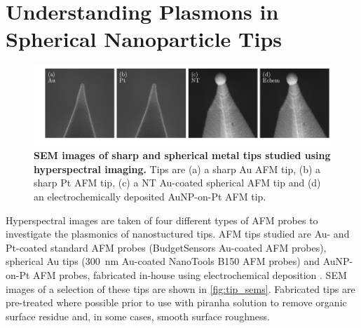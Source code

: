 \documentclass{article}
\begin{document}
\section{Understanding Plasmons in Spherical Nanoparticle Tips}

\begin{figure}[bt]
\centering
\includegraphics{figures/tip_sems}
\caption[SEM images of sharp and spherical metal tips studied using hyperspectral imaging]{\textbf{SEM images of sharp and spherical metal tips studied using hyperspectral imaging.} Tips are  (a) a sharp Au AFM tip, (b) a sharp Pt AFM tip, (c) a NT Au-coated spherical AFM tip and (d) an electrochemically deposited AuNP-on-Pt AFM tip.}
\label{fig:tip_sems}
\vspace{-10pt}
\end{figure}

Hyperspectral images are taken of four different types of AFM probes to investigate the plasmonics of nanostuctured tips. AFM tips studied are Au- and Pt-coated standard AFM probes (BudgetSensors Au-coated AFM probes), spherical Au tips (\SI{300}{nm} Au-coated NanoTools B150 AFM probes) \cite{savage2012} and AuNP-on-Pt AFM probes, fabricated in-house using electrochemical deposition \cite{sanders2014}. SEM images of a selection of these tips are shown in \autoref{fig:tip_sems}. Fabricated tips are pre-treated where possible prior to use with piranha solution to remove organic surface residue and, in some cases, smooth surface roughness. %
\end{document}
